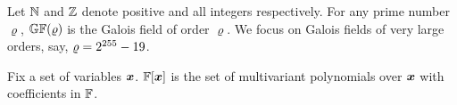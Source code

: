 
Let $\mathbb{N}$ and $\mathbb{Z}$ denote positive and all integers
respectively. For any prime number $\varrho$, $\mathbb{GF}(\varrho)$ is the
Galois field of order $\varrho$. We focus on Galois fields of very
large orders, say, $\varrho = 2^{255} - 19$. 

Fix a set of variables $\vx$. $\bbfF[\vx]$ is the set of multivariant
polynomials over $\vx$ with coefficients in $\mathbb{F}$. 
